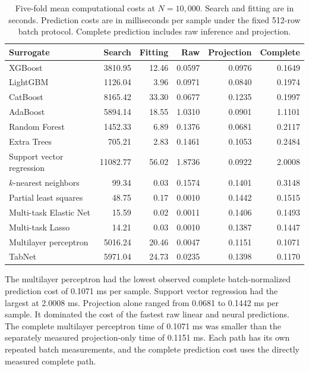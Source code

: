 \begin{table}[htbp]
\centering\footnotesize
\setlength{\tabcolsep}{3pt}
\caption{Five-fold mean computational costs at $N=10{,}000$. Search and fitting are in seconds. Prediction costs are in milliseconds per sample under the fixed 512-row batch protocol. Complete prediction includes raw inference and projection.}
\label{tab:projection_timing_results}
\begin{tabular}{p{3.7cm}rrrrr}
\toprule
Surrogate & Search & Fitting & Raw & Projection & Complete\\
\midrule
XGBoost & 3810.95 & 12.46 & 0.0597 & 0.0976 & 0.1649\\
LightGBM & 1126.04 & 3.96 & 0.0971 & 0.0840 & 0.1974\\
CatBoost & 8165.42 & 33.30 & 0.0677 & 0.1235 & 0.1997\\
AdaBoost & 5894.14 & 18.55 & 1.0310 & 0.0901 & 1.1101\\
Random Forest & 1452.33 & 6.89 & 0.1376 & 0.0681 & 0.2117\\
Extra Trees & 705.21 & 2.83 & 0.1461 & 0.1053 & 0.2484\\
Support vector regression & 11082.77 & 56.02 & 1.8736 & 0.0922 & 2.0008\\
$k$-nearest neighbors & 99.34 & 0.03 & 0.1574 & 0.1401 & 0.3148\\
Partial least squares & 48.75 & 0.17 & 0.0010 & 0.1442 & 0.1515\\
Multi-task Elastic Net & 15.59 & 0.02 & 0.0011 & 0.1406 & 0.1493\\
Multi-task Lasso & 14.21 & 0.03 & 0.0010 & 0.1387 & 0.1447\\
Multilayer perceptron & 5016.24 & 20.46 & 0.0047 & 0.1151 & 0.1071\\
TabNet & 5971.04 & 24.73 & 0.0235 & 0.1398 & 0.1170\\
\bottomrule
\end{tabular}
\end{table}

The multilayer perceptron had the lowest observed complete batch-normalized prediction cost of 0.1071 ms per sample. Support vector regression had the largest at 2.0008 ms. Projection alone ranged from 0.0681 to 0.1442 ms per sample. It dominated the cost of the fastest raw linear and neural predictions. The complete multilayer perceptron time of 0.1071 ms was smaller than the separately measured projection-only time of 0.1151 ms. Each path has its own repeated batch measurements, and the complete prediction cost uses the directly measured complete path.

